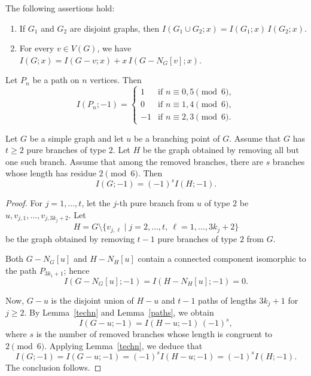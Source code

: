 \documentclass[10pt,a4paper]{amsart}
\begin{document}
\begin{lem}\label{techn}
The following assertions hold:
\begin{enumerate}
    \item If \( G_1 \) and \( G_2 \) are disjoint graphs, then \( I(G_1 \cup G_2; x) = I(G_1; x)\, I(G_2; x) \).
    \item For every \( v \in V(G) \), we have \( I(G; x) = I(G - v; x) + x\, I(G - N_G[v]; x) \).
\end{enumerate}
\end{lem}

\begin{lem}\label{paths}
Let \( P_n \) be a path on \( n \) vertices. Then
\[
I(P_n; -1) =
\begin{cases}
    1 & \text{if } n \equiv 0, 5 \pmod{6},\\
    0 & \text{if } n \equiv 1, 4 \pmod{6},\\
    -1 & \text{if } n \equiv 2, 3 \pmod{6}.
\end{cases}
\]
\end{lem}

\begin{lem}\label{lem_pure_type_2}
Let \( G \) be a simple graph and let \( u \) be a branching point of \( G \). Assume that \( G \) has \( t \ge 2 \) pure branches of type \( 2 \). Let \( H \) be the graph obtained by removing all but one such branch. Assume that among the removed branches, there are \( s \) branches whose length has residue \( 2 \pmod{6} \). Then
\[
I(G;-1) = (-1)^s I(H;-1).
\]
\end{lem}

\begin{proof}
For \( j = 1, \ldots, t \), let the \( j \)-th pure branch from \( u \) of type \( 2 \) be
\( u, v_{j,1}, \ldots, v_{j,3k_j+2} \).
Let
\[
H = G \setminus \{ v_{j,\ell} \mid j = 2, \ldots, t,\ \ell = 1, \ldots, 3k_j+2 \}
\]
be the graph obtained by removing \( t-1 \) pure branches of type \( 2 \) from \( G \).

Both \( G - N_G[u] \) and \( H - N_H[u] \) contain a connected component isomorphic to the path \( P_{3k_1+1} \); hence
\[
I(G-N_G[u];-1) = I(H-N_H[u];-1) = 0.
\]

Now, \( G - u \) is the disjoint union of \( H - u \) and \( t-1 \) paths of lengths \( 3k_j+1 \) for \( j \ge 2 \). By Lemma~\ref{techn} and Lemma~\ref{paths}, we obtain
\[
I(G-u;-1) = I(H-u;-1)\,(-1)^s,
\]
where \( s \) is the number of removed branches whose length is congruent to \( 2 \pmod{6} \). Applying Lemma~\ref{techn}, we deduce that
\[
I(G;-1)
= I(G-u;-1)
= (-1)^s I(H-u;-1)
= (-1)^s I(H;-1).
\]
The conclusion follows.
\end{proof}
\end{document}
